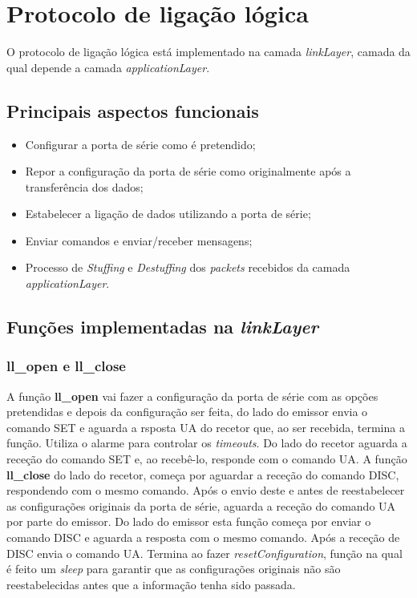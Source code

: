 \documentclass[11pt]{article}
\begin{document}
\section{Protocolo de ligação lógica}

O protocolo de ligação lógica está implementado na camada \textit{linkLayer}, camada da qual depende a camada \textit{applicationLayer}.

\subsection{Principais aspectos funcionais}
\small
\begin{itemize}
\setlength\itemsep{0em}
  \item Configurar a porta de série como é pretendido;
  \item Repor a configuração da porta de série como originalmente após a transferência dos dados;
  \item  Estabelecer a ligação de dados utilizando a porta de série;
  \item  Enviar comandos e  enviar/receber mensagens;
  \item Processo de \textit{Stuffing} e \textit{Destuffing} dos \textit{packets} recebidos da camada \textit{applicationLayer}.
\end{itemize}
\normalsize


\subsection{Funções implementadas na \textit{linkLayer}}

 \subsubsection{ll\_open e ll\_close} 

  A função \textbf{ll\_open} vai fazer a configuração da porta de série com as opções pretendidas e depois da configuração ser feita, do lado do emissor envia o comando SET e aguarda a rsposta UA do recetor que, ao ser recebida, termina a função. Utiliza o alarme para controlar os \textit{timeouts}. Do lado do recetor aguarda a receção do comando SET e, ao recebê-lo, responde com o comando UA. A função \textbf{ll\_close} do lado do recetor, começa por aguardar a receção do comando DISC, respondendo com o mesmo comando. Após o envio deste e antes de reestabelecer as configurações originais da porta de série, aguarda a receção do comando UA por parte do emissor. Do lado do emissor esta função começa por enviar o comando DISC e aguarda a resposta com o mesmo comando. Após a receção de DISC envia o comando UA. Termina ao fazer \textit{resetConfiguration}, função na qual é feito um \textit{sleep} para garantir que as configurações originais não são reestabelecidas antes que a informação tenha sido passada.
   
\end{document}
